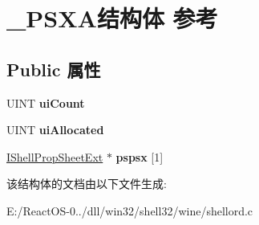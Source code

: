 \hypertarget{struct___p_s_x_a}{}\section{\+\_\+\+P\+S\+X\+A结构体 参考}
\label{struct___p_s_x_a}
\subsection*{Public 属性}
\begin{DoxyCompactItemize}
\item 
\mbox{\label{struct___p_s_x_a_a48d1eecf671c749739363e332827dd39}} 
U\+I\+NT {\bfseries ui\+Count}
\item 
\mbox{\label{struct___p_s_x_a_ad9a8c4cd5aa40fc7f9ddd71a16f09a64}} 
U\+I\+NT {\bfseries ui\+Allocated}
\item 
\mbox{\label{struct___p_s_x_a_a4d062f2d9ae3e74c54b196ffe1de1e10}} 
\hyperlink{interface_i_shell_prop_sheet_ext}{I\+Shell\+Prop\+Sheet\+Ext} $\ast$ {\bfseries pspsx} \mbox{[}1\mbox{]}
\end{DoxyCompactItemize}


该结构体的文档由以下文件生成\+:\begin{DoxyCompactItemize}
\item 
E\+:/\+React\+O\+S-\/0../dll/win32/shell32/wine/shellord.\+c\end{DoxyCompactItemize}
